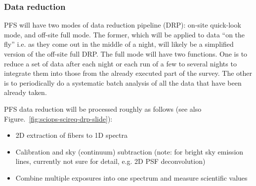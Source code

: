 \documentclass[a4paper,notitlepage]{article}
\begin{document}
%

\subsubsection{Data reduction}
\label{datareduction}

PFS will have two modes of data reduction pipeline (DRP): on-site
quick-look mode, and off-site full mode. The former, which will be
applied to data ``on the fly'' i.e. as they come out in the middle of a
night, will likely be a simplified version of the off-site full DRP. The
full mode will have two functions. One is to reduce a set of data after
each night or each run of a few to several nights to integrate them into
those from the already executed part of the survey. The other is to
periodically do a systematic batch analysis of all the data that have
been already taken.

PFS data reduction will be processed roughly as follows (see also
Figure.~\ref{fig:sciops-scireq-drp-slide}): 

\begin{itemize}
  \item 2D extraction of fibers to 1D spectra
  \item Calibration and sky (continuum) subtraction (note: for bright sky 
    emission lines, currently not sure for detail, e.g. 2D PSF deconvolution)
  \item Combine multiple exposures into one spectrum and measure scientific 
    values
\end{itemize}
\end{document}
